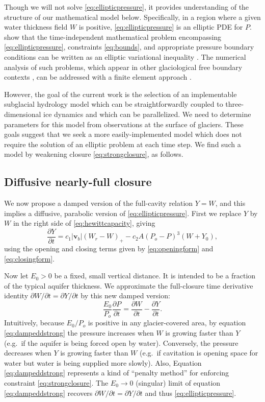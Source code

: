 \documentclass[11pt,final]{amsart}%
\newcommand\bv{\mathbf{v}}
\begin{document}
Though we will not solve \eqref{eq:ellipticpressure}, it provides understanding of the structure of our mathematical model below.  Specifically, in a region where a given water thickness field $W$ is positive, \eqref{eq:ellipticpressure} is an elliptic PDE for $P$.  \cite{Schoofetal2012} show that the time-independent mathematical problem encompassing \eqref{eq:ellipticpressure}, constraints \eqref{eq:bounds}, and appropriate pressure boundary conditions can be written as an elliptic variational inequality \citep{KinderlehrerStampacchia}.  The numerical analysis of such problems, which appear in other glaciological free boundary contexts \citep{SchoofStream,JouvetBueler2012}, can be addressed with a finite element approach \citep{Ciarlet}.

However, the goal of the current work is the selection of an implementable subglacial hydrology model which can be straightforwardly coupled to three-dimensional ice dynamics and which can be parallelized.  We need to determine parameters for this model from observations at the surface of glaciers.  These goals suggest that we seek a more easily-implemented model which does not require the solution of an elliptic problem at each time step.  We find such a model by weakening closure \eqref{eq:strongclosure}, as follows.

\subsection*{Diffusive nearly-full closure}  We now propose a damped version of the full-cavity relation $Y=W$, and this implies a diffusive, parabolic version of \eqref{eq:ellipticpressure}.  First we replace $Y$ by $W$ in the right side of \eqref{eq:hewittcapacity}, giving
\begin{equation}
\frac{\partial Y}{\partial t} = c_1 |\bv_b| (W_r - W)_+ - c_2 A (P_o - P)^3 (W+Y_0), \label{eq:capacity}
\end{equation}
using the opening and closing terms given by \eqref{eq:openingform} and \eqref{eq:closingform}.

Now let $E_0>0$ be a fixed, small vertical distance.  It is intended to be a fraction of the typical aquifer thickness.  We approximate the full-closure time derivative identity $\partial W/\partial t = \partial Y/\partial t$ by this new damped version:
\begin{equation}
\frac{E_0}{P_o} \frac{\partial P}{\partial t} =  \frac{\partial W}{\partial t}  - \frac{\partial Y}{\partial t}.\label{eq:dampeddstrong}
\end{equation}
Intuitively, because $E_0/P_o$ is positive in any glacier-covered area, by equation \eqref{eq:dampeddstrong} the pressure increases when $W$ is growing faster than $Y$ (e.g.~if the aquifer is being forced open by water).  Conversely, the pressure decreases when $Y$ is growing faster than $W$ (e.g.~if cavitation is opening space for water but water is being supplied more slowly).  Also, Equation \eqref{eq:dampeddstrong} represents a kind of ``penalty method'' \citep{NocedalWright} for enforcing constraint \eqref{eq:strongclosure}.  The $E_0\to 0$ (singular) limit of equation \eqref{eq:dampeddstrong} recovers $\partial W/\partial t = \partial Y/\partial t$ and thus \eqref{eq:ellipticpressure}.
\end{document}
